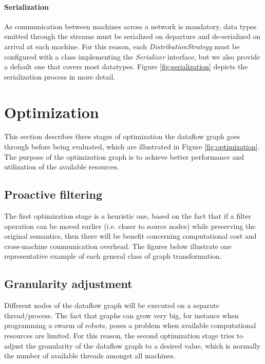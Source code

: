 \documentclass[sigplan,review,anonymous]{acmart}
\begin{document}
\paragraph{Serialization}
As communication between machines across a network is mandatory, data types
emitted through the streams must be serialized on departure and de-serialized on
arrival at each machine. For this reason, each \textit{DistributionStrategy}
must be configured with a class implementing the \textit{Serializer} interface,
but we also provide a default one that covers most datatypes. Figure \ref{fig:serialization}
depicts the serialization process in more detail.


\section{Optimization} \label{sec:optimization}

This section describes three stages of optimization the dataflow graph goes
through before being evaluated, which are illustrated in Figure \ref{fig:optimization}.
The purpose of the optimization graph is to achieve better performance and
utilization of the available resources.


\subsection{Proactive filtering}

The first optimization stage is a heuristic one, based on the fact that if a
filter operation can be moved earlier (i.e. closer to source nodes) while
preserving the original semantics, then there will be benefit concerning
computational cost and cross-machine communication overhead. The figures below
illustrate one representative example of each general class of
graph transformation.


\subsection{Granularity adjustment}

Different nodes of the dataflow graph will be executed on a separate
thread/process. The fact that graphs can grow very big, for instance when
programming a swarm of robots, poses a problem when available
computational resources are limited. For this reason, the second optimization
stage tries to adjust the granularity of the dataflow graph to a desired value,
which is normally the number of available threads amongst all machines.
\end{document}
